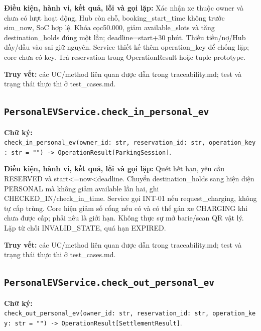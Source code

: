 \documentclass[11pt,a4paper]{article}
\begin{document}
\textbf{Điều kiện, hành vi, kết quả, lỗi và gọi lặp:} Xác nhận xe thuộc
owner và chưa có lượt hoạt động, Hub còn chỗ, booking\_start\_time không
trước sim\_now, SoC hợp lệ. Khóa cọc50.000, giảm available\_slots và
tăng destination\_holds đúng một lần; deadline=start+30 phút. Thiếu
tiền/nợ/Hub đầy/đầu vào sai giữ nguyên. Service thiết kế thêm
operation\_key để chống lặp; core chưa có key. Trả reservation trong
OperationResult hoặc tuple prototype.

\textbf{Truy vết:} các UC/method liên quan được dẫn trong
traceability.md; test và trạng thái thực thi ở test\_cases.md.

\hypertarget{personalevservice.check_in_personal_ev}{%
\subsection{\texorpdfstring{\texttt{PersonalEVService.check\_in\_personal\_ev}}{PersonalEVService.check\_in\_personal\_ev}}\label{personalevservice.check_in_personal_ev}}

\textbf{Chữ ký:}
\texttt{check\_in\_personal\_ev(owner\_id:\ str,\ reservation\_id:\ str,\ operation\_key:\ str\ =\ "")\ -\textgreater{}\ OperationResult{[}ParkingSession{]}}.

\textbf{Điều kiện, hành vi, kết quả, lỗi và gọi lặp:} Quét hết hạn, yêu
cầu RESERVED và start\textless=now\textless deadline. Chuyển
destination\_holds sang hiện diện PERSONAL mà không giảm available lần
hai, ghi CHECKED\_IN/check\_in\_time. Service gọi INT-01 nếu
request\_charging, không tự cấp trùng. Core hiện giảm số cổng nếu có và
có thể gán xe CHARGING khi chưa được cấp; phải nêu là giới hạn. Không
thực sự mở barie/scan QR vật lý. Lặp từ chối INVALID\_STATE, quá hạn
EXPIRED.

\textbf{Truy vết:} các UC/method liên quan được dẫn trong
traceability.md; test và trạng thái thực thi ở test\_cases.md.

\hypertarget{personalevservice.check_out_personal_ev}{%
\subsection{\texorpdfstring{\texttt{PersonalEVService.check\_out\_personal\_ev}}{PersonalEVService.check\_out\_personal\_ev}}\label{personalevservice.check_out_personal_ev}}

\textbf{Chữ ký:}
\texttt{check\_out\_personal\_ev(owner\_id:\ str,\ reservation\_id:\ str,\ operation\_key:\ str\ =\ "")\ -\textgreater{}\ OperationResult{[}SettlementResult{]}}.
\end{document}
